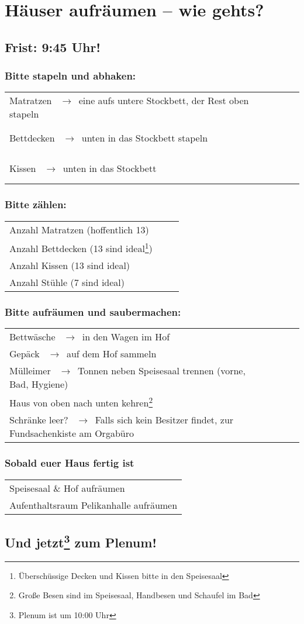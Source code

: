 \documentclass[14pt,parskip=full+]{scrartcl}
\newcommand{\checkfield}{~ \hfill ~\raisebox{-5pt}{\tikz\node[draw,minimum width=16.8pt,minimum height=16.8pt]{};}}
\newcommand{\countfield}{~ \hfill ~\raisebox{-5pt}{\tikz\node[draw,minimum width=33.6pt,minimum height=16.8pt]{};}}
\newcommand{\pfeil}{~\ensuremath{\rightarrow}~}
\newcommand{\mysection}[1]{\vspace{-.7\baselineskip}\subsubsection*{#1} \vspace{-.7\baselineskip}}
\begin{document}
\parbox[t]{.8\textwidth}{\vskip0pt
\section*{H\"auser aufr\"aumen -- wie gehts?}
\subsection*{Frist: 9:45 Uhr!}
}

\bigskip

\def\arraystretch{1.3}

\mysection{Bitte stapeln und abhaken:}
\begin{tabularx}{\textwidth}{Xc}
Matratzen \pfeil eine aufs untere Stockbett, der Rest oben stapeln & \checkfield \\
Bettdecken \pfeil unten in das Stockbett stapeln & \checkfield \\
Kissen \pfeil unten in das Stockbett & \checkfield
\end{tabularx}


\mysection{Bitte z\"ahlen:}
\begin{tabularx}{\textwidth}{Xc}
Anzahl Matratzen (hoffentlich 13) & \countfield \\
Anzahl Bettdecken (13 sind ideal\footnote{\"Ubersch\"ussige Decken und Kissen bitte in den Speisesaal}) & \countfield \\
Anzahl Kissen (13 sind ideal\footnotemark[1]) & \countfield \\
Anzahl St\"uhle (7 sind ideal) & \countfield
\end{tabularx}

\mysection{Bitte aufr\"aumen und saubermachen:}
 \begin{tabularx}{\textwidth}{Xc}
 Bettw\"asche \pfeil in den Wagen im Hof & \checkfield \\
 Gep\"ack \pfeil auf dem Hof sammeln & \checkfield \\
 M\"ulleimer \pfeil Tonnen neben Speisesaal trennen (vorne, Bad, Hygiene) & \checkfield\checkfield\checkfield \hspace*{-19px}\\
 Haus von oben nach unten kehren\footnote{Gro\ss e Besen sind im Speisesaal, Handbesen und Schaufel im Bad} & \checkfield \\
 Schr\"anke leer? \pfeil Falls sich kein Besitzer findet, zur Fundsachenkiste am Orgabüro & \checkfield
 \end{tabularx}
 
\mysection{Sobald euer Haus fertig ist}
\begin{tabularx}{\textwidth}{X}
  Speisesaal \& Hof aufräumen \\
  Aufenthaltsraum Pelikanhalle aufräumen \\
\end{tabularx}

\subsection*{Und jetzt\footnote{Plenum ist um 10:00 Uhr} zum Plenum!}
\end{document}
